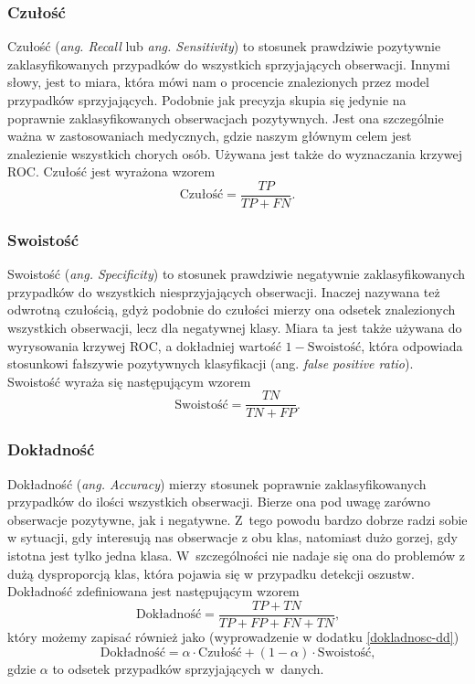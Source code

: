 \documentclass[inzynierska]{pwr_wmat_praca_dyplomowa}
\theoremstyle{plain}
\numberwithin{theorem}{chapter}
\theoremstyle{definition}
\numberwithin{theorem}{chapter}
\begin{document}
\subsubsection{Czułość}
Czułość (\textit{ang. Recall} lub \textit{ang. Sensitivity}) to stosunek prawdziwie pozytywnie zaklasyfikowanych przypadków do wszystkich sprzyjających obserwacji. Innymi słowy, jest to miara, która mówi nam o procencie znalezionych przez model przypadków sprzyjających. Podobnie jak precyzja skupia się jedynie na poprawnie zaklasyfikowanych obserwacjach pozytywnych. Jest ona szczególnie ważna w zastosowaniach medycznych, gdzie naszym głównym celem jest znalezienie wszystkich chorych osób. Używana jest także do wyznaczania krzywej ROC. Czułość jest wyrażona wzorem
$$ \text{Czułość}= \frac{TP}{TP + FN} \text{.}$$

\subsubsection{Swoistość}
Swoistość (\textit{ang. Specificity}) to stosunek prawdziwie negatywnie zaklasyfikowanych przypadków do wszystkich niesprzyjających obserwacji. Inaczej nazywana też odwrotną czułością, gdyż podobnie do czułości mierzy ona odsetek znalezionych wszystkich obserwacji, lecz dla negatywnej klasy. Miara ta jest także używana do wyrysowania krzywej ROC, a dokładniej wartość $1- \text{Swoistość}$, która odpowiada stosunkowi fałszywie pozytywnych klasyfikacji (ang. \textit{false positive ratio}). Swoistość wyraża się następującym wzorem
$$ \text{Swoistość}= \frac{TN}{TN + FP} \text{.}$$

\subsubsection{Dokładność}
Dokładność (\textit{ang. Accuracy}) mierzy stosunek poprawnie zaklasyfikowanych przypadków do ilości wszystkich obserwacji. Bierze ona pod uwagę zarówno obserwacje pozytywne, jak i negatywne. Z~tego powodu bardzo dobrze radzi sobie w sytuacji, gdy interesują nas obserwacje z obu klas, natomiast dużo gorzej, gdy istotna jest tylko jedna klasa. W~szczególności nie nadaje się ona do problemów z dużą dysproporcją klas, która pojawia się w przypadku detekcji oszustw. Dokładność zdefiniowana jest następującym wzorem
$$ \text{Dokładność} = \frac{TP + TN}{TP + FP + FN + TN} \text{,}$$
który możemy zapisać również jako (wyprowadzenie w dodatku \ref{dokladnosc-dd})
\begin{equation}
	\label{dokl}
	\text{Dokładność} = \alpha \cdot \text{Czułość} + (1-\alpha) \cdot \text{Swoistość} \text{,}
\end{equation}
gdzie $\alpha$ to odsetek przypadków sprzyjających w~danych.
\end{document}

